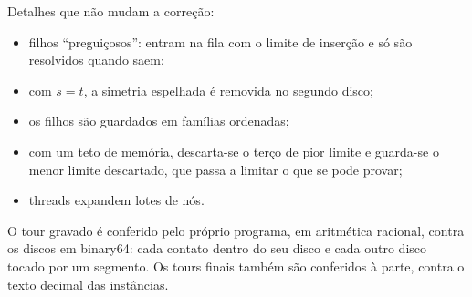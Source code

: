 \documentclass[11pt]{article}
\theoremstyle{plain}
\theoremstyle{remark}
\begin{document}
Detalhes que não mudam a correção:
\begin{itemize}
  \item filhos ``preguiçosos'': entram na fila com o limite de inserção e só são resolvidos
    quando saem;
  \item com $s=t$, a simetria espelhada é removida no segundo disco;
  \item os filhos são guardados em famílias ordenadas;
  \item com um teto de memória, descarta-se o terço de pior limite e guarda-se o menor
    limite descartado, que passa a limitar o que se pode provar;
  \item threads expandem lotes de nós.
\end{itemize}
O tour gravado é conferido pelo próprio programa, em aritmética racional, contra os discos em
binary64: cada contato dentro do seu disco e cada outro disco tocado por um segmento. Os tours
finais também são conferidos à parte, contra o texto decimal das instâncias.
\end{document}
